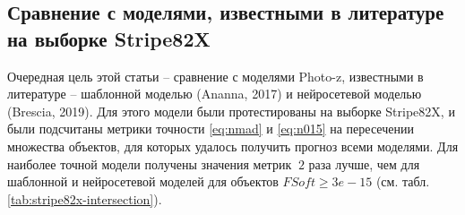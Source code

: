 \documentclass[fleqn,usenatbib]{mnras}
\begin{document}



\subsection{Сравнение с моделями, известными в литературе на выборке Stripe82X}\label{ssec:sota-comp}

Очередная цель этой статьи -- сравнение с моделями Photo-z, известными в литературе -- шаблонной моделью (Ananna, 2017) и нейросетевой моделью (Brescia, 2019). Для этого модели были протестированы на выборке Stripe82X, и были подсчитаны метрики точности \eqref{eq:nmad} и \eqref{eq:n015} на пересечении множества объектов, для которых удалось получить прогноз всеми моделями. Для наиболее точной модели получены значения метрик $~2$ раза лучше, чем для шаблонной и нейросетевой моделей для объектов $FSoft \geq 3e-15$ (см. табл. \ref{tab:stripe82x-intersection}).
\end{document}
